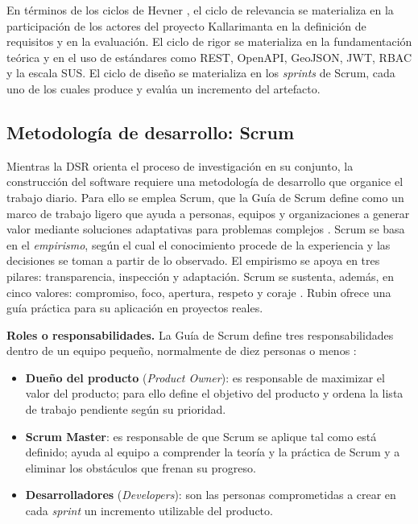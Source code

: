 En términos de los ciclos de Hevner \cite{hevner2007three}, el ciclo de relevancia se materializa en la participación de los actores del proyecto Kallarimanta en la definición de requisitos y en la evaluación. El ciclo de rigor se materializa en la fundamentación teórica y en el uso de estándares como REST, OpenAPI, GeoJSON, JWT, RBAC y la escala SUS. El ciclo de diseño se materializa en los \textit{sprints} de Scrum, cada uno de los cuales produce y evalúa un incremento del artefacto.

\subsection{Metodología de desarrollo: Scrum}
Mientras la DSR orienta el proceso de investigación en su conjunto, la construcción del software requiere una metodología de desarrollo que organice el trabajo diario. Para ello se emplea Scrum, que la Guía de Scrum define como un marco de trabajo ligero que ayuda a personas, equipos y organizaciones a generar valor mediante soluciones adaptativas para problemas complejos \cite{schwaber2020scrum}. Scrum se basa en el \textit{empirismo}, según el cual el conocimiento procede de la experiencia y las decisiones se toman a partir de lo observado. El empirismo se apoya en tres pilares: transparencia, inspección y adaptación. Scrum se sustenta, además, en cinco valores: compromiso, foco, apertura, respeto y coraje \cite{schwaber2020scrum}. Rubin \cite{rubin2012essential} ofrece una guía práctica para su aplicación en proyectos reales.

\textbf{Roles o responsabilidades.} La Guía de Scrum define tres responsabilidades dentro de un equipo pequeño, normalmente de diez personas o menos \cite{schwaber2020scrum}:

\begin{itemize}
  \item \textbf{Dueño del producto} (\textit{Product Owner}): es responsable de maximizar el valor del producto; para ello define el objetivo del producto y ordena la lista de trabajo pendiente según su prioridad.
  \item \textbf{Scrum Master}: es responsable de que Scrum se aplique tal como está definido; ayuda al equipo a comprender la teoría y la práctica de Scrum y a eliminar los obstáculos que frenan su progreso.
  \item \textbf{Desarrolladores} (\textit{Developers}): son las personas comprometidas a crear en cada \textit{sprint} un incremento utilizable del producto.
\end{itemize}

